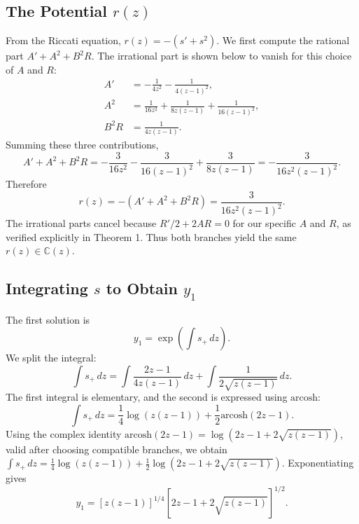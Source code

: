\documentclass[11pt,a4paper]{article}
\theoremstyle{definition}
\begin{document}
\subsection{The Potential \(r(z)\)}
From the Riccati equation, \(r(z) = -(s' + s^2)\). We first compute the rational part \(A' + A^2 + B^2R\). The irrational part is shown below to vanish for this choice of \(A\) and \(R\):
\begin{align}
A' &= -\frac{1}{4z^2} - \frac{1}{4(z-1)^2}, \\
A^2 &= \frac{1}{16z^2} + \frac{1}{8z(z-1)} + \frac{1}{16(z-1)^2}, \\
B^2R &= \frac{1}{4z(z-1)}.
\end{align}
Summing these three contributions,
\begin{equation}
A' + A^2 + B^2R = -\frac{3}{16z^2} - \frac{3}{16(z-1)^2} + \frac{3}{8z(z-1)} = -\frac{3}{16z^2(z-1)^2}.
\end{equation}
Therefore
\begin{equation}
r(z) = -(A' + A^2 + B^2R) = \frac{3}{16z^2(z-1)^2}. \label{eq:potential}
\end{equation}
The irrational parts cancel because \(R'/2 + 2AR = 0\) for our specific \(A\) and \(R\), as verified explicitly in Theorem 1. Thus both branches yield the same \(r(z) \in \mathbb{C}(z)\).

\subsection{Integrating \(s\) to Obtain \(y_1\)}
The first solution is
\begin{equation}
y_1 = \exp\left(\int s_{+}\,dz\right).
\end{equation}
We split the integral:
\begin{equation}
\int s_{+}\,dz = \int \frac{2z-1}{4z(z-1)}\,dz + \int \frac{1}{2\sqrt{z(z-1)}}\,dz.
\end{equation}
The first integral is elementary, and the second is expressed using \(\text{arcosh}\):
\begin{equation}
\int s_{+}\,dz = \frac{1}{4}\log(z(z-1)) + \frac{1}{2}\text{arcosh}(2z-1).
\end{equation}
Using the complex identity \(\text{arcosh}(2z-1) = \log(2z-1 + 2\sqrt{z(z-1)})\), valid after choosing compatible branches, we obtain \(\int s_{+}\,dz = \frac{1}{4}\log(z(z-1)) + \frac{1}{2}\log(2z-1 + 2\sqrt{z(z-1)})\). Exponentiating gives
\begin{equation}
y_1 = [z(z-1)]^{1/4}[2z-1 + 2\sqrt{z(z-1)}]^{1/2}. \label{eq:sol1}
\end{equation}
\end{document}
